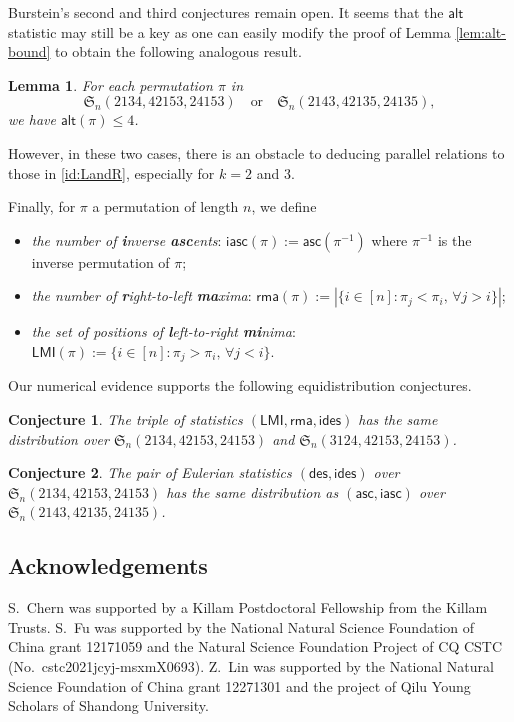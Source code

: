 \documentclass[reqno]{amsart}
\numberwithin{equation}{section}
\theoremstyle{plain}
\newtheorem{lemma}[theorem]{Lemma}
\newtheorem{conjecture}{Conjecture}[section]
\theoremstyle{definition}
\theoremstyle{named}
\newcommand{\fS}{\mathfrak{S}}
\newcommand{\asc}{\mathsf{asc}}
\newcommand{\des}{\mathsf{des}}
\newcommand{\ides}{\mathsf{ides}}
\newcommand{\alt}{\mathsf{alt}}
\newcommand{\LMI}{\mathsf{LMI}}
\newcommand{\rma}{\mathsf{rma}}
\newcommand{\iasc}{\mathsf{iasc}}
\begin{document}
Burstein's second and third conjectures remain open. It seems that the $\alt$ statistic may still be a key as one can easily modify the proof of Lemma \ref{lem:alt-bound} to obtain the following analogous result.

\begin{lemma}
	For each permutation $\pi$ in
	$$\fS_n(2134, 42153, 24153)\quad\text{or}\quad\fS_n(2143, 42135, 24135),$$
	we have $\alt(\pi)\le 4$.
\end{lemma}

However, in these two cases, there is an obstacle to deducing parallel relations to those in \eqref{id:LandR}, especially for $k=2$ and $3$.

Finally, for $\pi$ a permutation of length $n$, we define
\begin{itemize}[leftmargin=*,align=left]
	\renewcommand{\labelitemi}{$\triangleright$}
	\item \textit{the number of \textbf{i}nverse \textbf{asc}ents}: $\iasc(\pi):=\asc(\pi^{-1})$ where $\pi^{-1}$ is the inverse permutation of $\pi$;
	
	\item \textit{the number of \textbf{r}ight-to-left \textbf{ma}xima}: $\rma(\pi):=|\{i\in[n]: \pi_j<\pi_i,\, \forall j>i\}|$; 
	
	\item \textit{the set of positions of \textbf{l}eft-to-right \textbf{mi}nima}: $\LMI(\pi):=\{i\in[n]: \pi_j>\pi_i,\, \forall j<i\}$.
\end{itemize}

Our numerical evidence supports the following equidistribution conjectures.

\begin{conjecture}
	The triple of statistics $(\LMI,\rma,\ides)$ has the same distribution over $\fS_n(2134,42153,24153)$ and $\fS_n(3124,42153,24153)$. 
\end{conjecture}

\begin{conjecture}
	The pair of Eulerian statistics $(\des,\ides)$ over  $\fS_n(2134,42153,\allowbreak 24153)$ has the same distribution as $(\asc,\iasc)$ over $\fS_n(2143,42135,24135)$. 
\end{conjecture}

\subsection*{Acknowledgements}

S.~Chern was supported by a Killam Postdoctoral Fellowship from the Killam Trusts.
S.~Fu was supported by the National Natural Science Foundation of China grant 12171059 and the Natural Science Foundation Project of CQ CSTC (No.~cstc2021jcyj-msxmX0693).
 Z.~Lin was supported by the National Natural Science Foundation of China grant 12271301 and  the project of Qilu Young Scholars of Shandong University.
\end{document}
